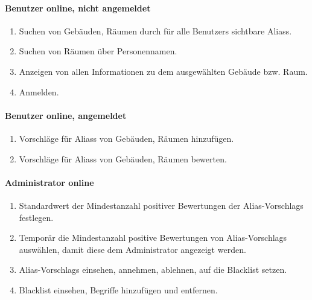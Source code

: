 \paragraph{\Gls{Benutzer} online, nicht angemeldet}
\begin{enumerate}[label=\textbf{/T\arabic*0/}, align=left]
	\item Suchen von Gebäuden, Räumen durch für alle \Glspl{Benutzer} sichtbare \Glspl{Alias}.
	\item Suchen von Räumen über Personennamen.
	\item Anzeigen von allen Informationen zu dem ausgewählten Gebäude bzw. Raum.
	\item Anmelden.
\end{enumerate}

\paragraph{\Gls{Benutzer} online, angemeldet}
\begin{enumerate}[label=\textbf{/T\arabic*0/}, align=left]
	\item Vorschläge für \Glspl{Alias} von Gebäuden, Räumen hinzufügen.
	\item Vorschläge für \Glspl{Alias} von Gebäuden, Räumen bewerten.
\end{enumerate}

\paragraph{\Gls{Administrator} online}
\begin{enumerate}[label=\textbf{/T\arabic*0/}, align=left]
	\item Standardwert der Mindestanzahl positiver Bewertungen der \Glspl{Alias-Vorschlag} festlegen.
	\item Temporär die Mindestanzahl positive Bewertungen von \Glspl{Alias-Vorschlag} auswählen, damit diese dem \Gls{Administrator} angezeigt werden.
	\item \Glspl{Alias-Vorschlag} einsehen, annehmen, ablehnen, auf die \Gls{Blacklist} setzen.
	\item \Gls{Blacklist} einsehen, Begriffe hinzufügen und entfernen.
\end{enumerate}
